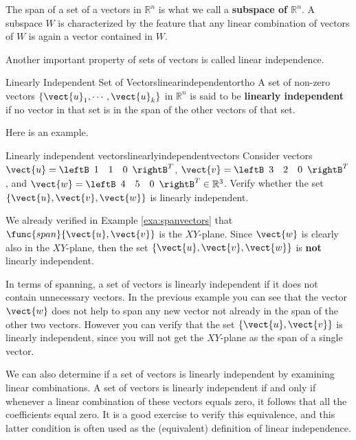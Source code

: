 The span of a set of a vectors in $\mathbb{R}^n$ is what we call a \textbf{subspace of $\mathbb{R}^n$}. A subspace $W$ is characterized by the feature that any linear combination of vectors of $W$ is again a vector contained in $W$. 

Another important property of sets of vectors is called linear independence. 

\begin{definition}{Linearly Independent Set of Vectors}{linearindependentortho}
A set of non-zero vectors $\{ \vect{u}_1, \cdots ,\vect{u}_k\}$ in $\mathbb{R}^{n}$ is said to be 
\textbf{linearly independent}
 if no vector in that set is in the span of the other vectors of that set.
\end{definition}

Here is an example.  

\begin{example}{Linearly independent vectors}{linearlyindependentvectors}
Consider vectors $\vect{u}=\leftB 
\begin{array}{rrr}
1  & 1 & 0
\end{array}
\rightB^T$, 
$\vect{v}=\leftB 
\begin{array}{rrr}
3  & 2 & 0
\end{array}
\rightB^T$, and
$\vect{w}=\leftB 
\begin{array}{rrr}
4  & 5 & 0
\end{array}
\rightB^T  \in \mathbb{R}^{3}$.
Verify whether the set $\{\vect{u}, \vect{v}, \vect{w}\}$ is linearly independent. 
\end{example}

\begin{solution}
We already verified in Example \ref{exa:spanvectors} that
$\func{span} \{\vect{u}, \vect{v} \}$ is the $XY$-plane. Since $\vect{w}$
is clearly also in the $XY$-plane, then the set $\{\vect{u}, \vect{v},
\vect{w}\}$ is \textbf{not} linearly independent.
\end{solution}

In terms of spanning, a set of vectors is linearly independent if it
does not contain unnecessary vectors. In the previous example you
can see that the vector $\vect{w}$ does not help to span any new vector
not already in the span of the other two vectors. However you can
verify that the set $\{\vect{u}, \vect{v}\}$ is linearly independent,
since you will not get the $XY$-plane as the span of a single vector.

We can also determine if a set of vectors is linearly independent by examining linear combinations. A set of vectors is linearly independent if and only if
whenever a linear combination of these vectors equals zero, it follows
that all the coefficients equal zero. It is a good exercise to verify
this equivalence, and this latter condition is often used as the
(equivalent) definition of linear independence.

